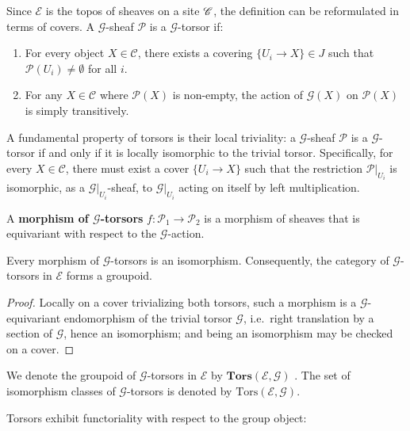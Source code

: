 Since $\mathcal{E}$ is the topos of sheaves on a site $\mathscr{C}$, the definition can be reformulated in terms of covers. A $\mathcal{G}$-sheaf $\mathcal{P}$ is a $\mathcal{G}$-torsor if:
\begin{enumerate}
    \item For every object $X \in \mathcal{C}$, there exists a covering $\{ U_i \to X \} \in J$ such that $\mathcal{P}(U_i) \neq \emptyset$ for all $i$.
    \item For any $X \in \mathcal{C}$ where $\mathcal{P}(X)$ is non-empty, the action of $\mathcal{G}(X)$ on $\mathcal{P}(X)$ is simply transitively.
\end{enumerate}

A fundamental property of torsors is their local triviality: 
a $\mathcal{G}$-sheaf $\mathcal{P}$ is a $\mathcal{G}$-torsor if and only if it is locally isomorphic to the trivial torsor. 
Specifically, for every $X \in \mathcal{C}$, there must exist a cover $\{ U_i \to X \}$ such that the restriction $\mathcal{P}|_{U_i}$ is 
isomorphic, as a $\mathcal{G}|_{U_i}$-sheaf, to $\mathcal{G}|_{U_i}$ acting on itself by left multiplication.

A \textbf{morphism of $\mathcal{G}$-torsors} $f: \mathcal{P}_1 \to \mathcal{P}_2$ is a morphism of sheaves that is equivariant with respect to the $\mathcal{G}$-action.

\begin{prop}\label{prop:torsor_morphism_iso}
    Every morphism of $\mathcal{G}$-torsors is an isomorphism.
    Consequently, the category of $\mathcal{G}$-torsors in $\mathcal{E}$ forms a groupoid.
\end{prop}
\begin{proof}
    Locally on a cover trivializing both torsors, such a morphism is a $\mathcal{G}$-equivariant endomorphism
    of the trivial torsor $\mathcal{G}$, i.e.\ right translation by a section of $\mathcal{G}$, hence an
    isomorphism; and being an isomorphism may be checked on a cover.
\end{proof}

\begin{definition}
    We denote the groupoid of $\mathcal{G}$-torsors in $\mathcal{E}$ by $\mathbf{Tors}(\mathcal{E}, \mathcal{G})$ .  The set of isomorphism classes of $\mathcal{G}$-torsors is denoted by $\mathrm{Tors}(\mathcal{E}, \mathcal{G})$.
\end{definition}

Torsors exhibit functoriality with respect to the group object:

